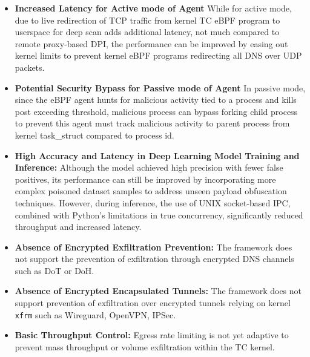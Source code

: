 \documentclass [11pt, proquest] {uwthesis}[2020/02/24]
\begin{document}
\begin{itemize}[nosep]

    \item \textbf{Increased Latency for Active mode of Agent}
    While for active mode, due to live redirection of TCP traffic from kernel TC eBPF program to userspace for deep scan adds additional latency, not much compared to remote proxy-based DPI, the performance can be improved by easing out kernel limits to prevent kernel eBPF programs redirecting all DNS over UDP packets.

    \item \textbf{Potential Security Bypass for Passive mode of Agent}
    In passive mode, since the eBPF agent hunts for malicious activity tied to a process and kills post exceeding threshold, malicious process can bypass forking child process to prevent this agent must track malicious activity to parent process from kernel task\_struct compared to process id.

    \item \textbf{High Accuracy and Latency in Deep Learning Model Training and Inference:} Although the model achieved high precision with fewer false positives, its performance can still be improved by incorporating more complex poisoned dataset samples to address unseen payload obfuscation techniques. However, during inference, the use of UNIX socket-based IPC, combined with Python’s limitations in true concurrency, significantly reduced throughput and increased latency.

  \item \textbf{Absence of Encrypted Exfiltration Prevention:} The framework does not support the prevention of exfiltration through encrypted DNS channels such as DoT or DoH.

  \item \textbf{Absence of Encrypted Encapsulated Tunnels:} The framework does not support prevention of exfiltration over encrypted tunnels relying on kernel \texttt{xfrm} such as Wireguard, OpenVPN, IPSec. 

  \item \textbf{Basic Throughput Control:} Egress rate limiting is not yet adaptive to prevent mass throughput or volume exfiltration within the TC kernel. 
\end{itemize}
\end{document}
